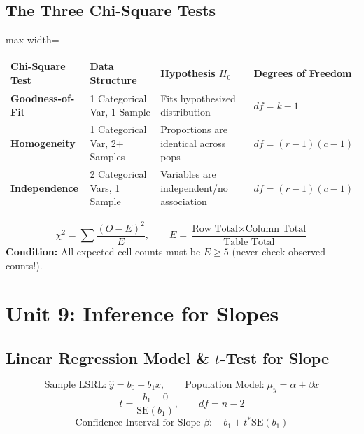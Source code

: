 ﻿\documentclass[11pt,oneside,openany]{book}
\begin{document}
\section{The Three Chi-Square Tests}
\begin{adjustbox}{max width=\linewidth}
\begin{tabular}{llll}
\toprule
\textbf{Chi-Square Test} & \textbf{Data Structure} & \textbf{Hypothesis $H_0$} & \textbf{Degrees of Freedom} \\
\midrule
\textbf{Goodness-of-Fit} & 1 Categorical Var, 1 Sample & Fits hypothesized distribution & $df = k - 1$ \\
\textbf{Homogeneity} & 1 Categorical Var, 2+ Samples & Proportions are identical across pops & $df = (r-1)(c-1)$ \\
\textbf{Independence} & 2 Categorical Vars, 1 Sample & Variables are independent/no association & $df = (r-1)(c-1)$ \\
\bottomrule
\end{tabular}
\end{adjustbox}

\begin{equation}
  \chi^2 = \sum \frac{(O - E)^2}{E}, \qquad E = \frac{\text{Row Total} \times \text{Column Total}}{\text{Table Total}}
\end{equation}
\textbf{Condition:} All expected cell counts must be $E \ge 5$ (never check observed counts!).

\chapter{Unit 9: Inference for Slopes}

\section{Linear Regression Model \& $t$-Test for Slope}
\begin{equation}
  \text{Sample LSRL:} \; \hat{y} = b_0 + b_1 x, \qquad \text{Population Model:} \; \mu_y = \alpha + \beta x
\end{equation}
\begin{equation}
  t = \frac{b_1 - 0}{\text{SE}(b_1)}, \qquad df = n - 2
\end{equation}
\begin{equation}
  \text{Confidence Interval for Slope } \beta: \quad b_1 \pm t^* \text{SE}(b_1)
\end{equation}
\end{document}
